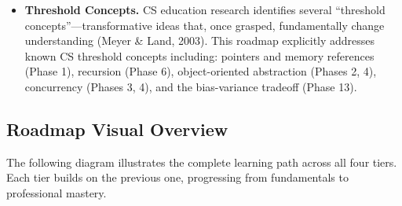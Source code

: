\documentclass[11pt, a4paper, oneside]{report}
\begin{document}
\begin{itemize}[leftmargin=*]
\item \textbf{Threshold Concepts.} CS education research identifies several ``threshold concepts''---transformative ideas that, once grasped, fundamentally change understanding (Meyer \& Land, 2003). This roadmap explicitly addresses known CS threshold concepts including: pointers and memory references (Phase 1), recursion (Phase 6), object-oriented abstraction (Phases 2, 4), concurrency (Phases 3, 4), and the bias-variance tradeoff (Phase 13).
\end{itemize}

\subsection*{Roadmap Visual Overview}

The following diagram illustrates the complete learning path across all four tiers.
Each tier builds on the previous one, progressing from fundamentals to professional mastery.
\end{document}
